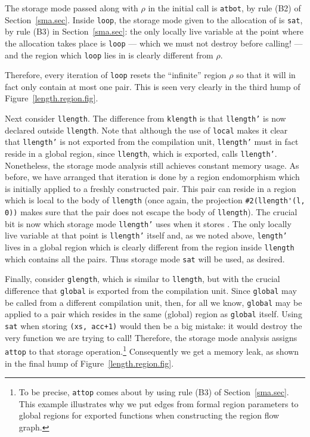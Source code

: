 \documentclass[12pt]{book}
\begin{document}
The storage mode passed along with $\rho$
in the initial call  is {\tt atbot}, by 
rule (B2) of Section~\ref{sma.sec}. Inside {\tt loop}, the storage
mode given to the allocation of  is {\tt sat},
by rule (B3) in Section~\ref{sma.sec}: the only locally live
variable at the point where the allocation takes place is {\tt loop}
--- which we must not destroy before calling! --- and the region which
{\tt loop} lies in is clearly different from $\rho$.

Therefore, every iteration of {\tt loop} resets the ``infinite'' region
$\rho$ so that it will in fact only contain at most one pair.
This is seen very clearly in the third hump of 
Figure~\ref{length.region.fig}.

Next consider {\tt llength}. The difference from {\tt klength} is
that {\tt llength'} is now declared outside {\tt llength}.
Note that although the use of {\tt local} makes it clear that {\tt llength'}
is not exported from the compilation unit, {\tt llength'} must in fact reside
in a global region, since {\tt llength}, which is exported, calls
{\tt llength'}.  Nonetheless, the storage mode analysis still achieves
constant memory usage. As before, we have arranged that iteration is
done by a region endomorphism which is initially applied to a freshly
constructed pair. This pair can reside in a region which is local to the
body of {\tt llength} (once again, the projection \verb+#2(llength'(l, 0))+
makes sure that the pair does not escape the body of {\tt llength}).
The crucial bit is now which storage mode {\tt llength'} uses 
when it stores .
The only locally live
variable at that point is {\tt llength'} itself and, as we noted above,
{\tt length'} lives in a global region which is clearly different
from the region inside {\tt llength} which contains all the pairs.
Thus storage mode {\tt sat} will be used, as desired.

Finally, consider {\tt glength}, which is similar to {\tt llength}, but
with the crucial difference that {\tt global} is exported from 
the compilation unit. Since {\tt global} may be called from a different
compilation unit, then, for all we know,
{\tt global} may  be applied to a pair which resides in the same
(global) region as {\tt global} itself. Using {\tt sat} when storing
{\tt (xs, acc+1)} would then be a big mistake: it would destroy
the very function we are trying to call! Therefore, the storage mode
analysis assigns {\tt attop} to that storage operation.\footnote{To be
precise, {\tt attop} comes about by using rule (B3) of
Section~\ref{sma.sec}. This example illustrates
why we put edges from formal region parameters to global regions for
exported functions when constructing the region 
flow graph.}
Consequently
we get a memory leak, as shown in the final hump of Figure~\ref{length.region.fig}. 
\end{document}
